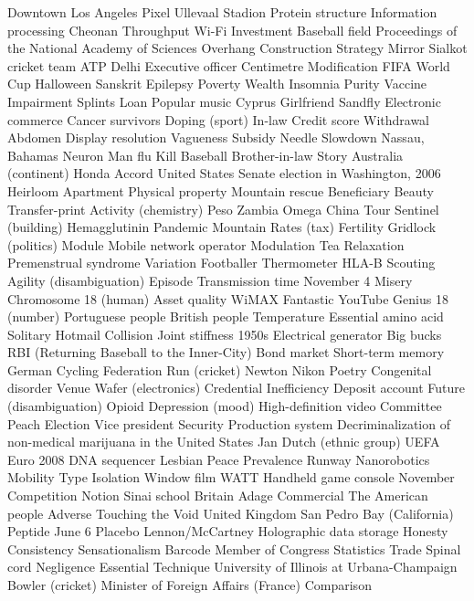 Downtown Los Angeles  Pixel  Ullevaal Stadion  
Protein structure  Information processing  Cheonan  
Throughput  Wi-Fi  Investment  
Baseball field  Proceedings of the National Academy of Sciences  Overhang  
Construction  Strategy  Mirror  
Sialkot cricket team  ATP  Delhi  
Executive officer  Centimetre  Modification  
FIFA World Cup  Halloween  Sanskrit  
Epilepsy  Poverty  Wealth  
Insomnia  Purity  Vaccine  
Impairment  Splints  Loan  
Popular music  Cyprus  Girlfriend  
Sandfly  Electronic commerce  Cancer survivors  
Doping (sport)  In-law  Credit score  
Withdrawal  Abdomen  Display resolution  
Vagueness  Subsidy  Needle  
Slowdown  Nassau, Bahamas  Neuron  
Man flu  Kill  Baseball  
Brother-in-law  Story  Australia (continent)  
Honda Accord  United States Senate election in Washington, 2006  Heirloom  
Apartment  Physical property  Mountain rescue  
Beneficiary  Beauty  Transfer-print  
Activity (chemistry)  Peso  Zambia  
Omega China Tour  Sentinel (building)  Hemagglutinin  
Pandemic  Mountain  Rates (tax)  
Fertility  Gridlock (politics)  Module  
Mobile network operator  Modulation  Tea  
Relaxation  Premenstrual syndrome  Variation  
Footballer  Thermometer  HLA-B  
Scouting  Agility (disambiguation)  Episode  
Transmission time  November 4  Misery  
Chromosome 18 (human)  Asset quality  WiMAX  
Fantastic  YouTube  Genius  
18 (number)  Portuguese people  British people  
Temperature  Essential amino acid  Solitary  
Hotmail  Collision  Joint stiffness  
1950s  Electrical generator  Big bucks  
RBI (Returning Baseball to the Inner-City)  Bond market  Short-term memory  
German Cycling Federation  Run (cricket)  Newton  
Nikon  Poetry  Congenital disorder  
Venue  Wafer (electronics)  Credential  
Inefficiency  Deposit account  Future (disambiguation)  
Opioid  Depression (mood)  High-definition video  
Committee  Peach  Election  
Vice president  Security  Production system  
Decriminalization of non-medical marijuana in the United States  Jan  Dutch (ethnic group)  
UEFA Euro 2008  DNA sequencer  Lesbian  
Peace  Prevalence  Runway  
Nanorobotics  Mobility  Type  
Isolation  Window film  WATT  
Handheld game console  November  Competition  
Notion  Sinai school  Britain  
Adage  Commercial  The American people  
Adverse  Touching the Void  United Kingdom  
San Pedro Bay (California)  Peptide  June 6  
Placebo  Lennon/McCartney  Holographic data storage  
Honesty  Consistency  Sensationalism  
Barcode  Member of Congress  Statistics  
Trade  Spinal cord  Negligence  
Essential  Technique  University of Illinois at Urbana-Champaign  
Bowler (cricket)  Minister of Foreign Affairs (France)  Comparison  
